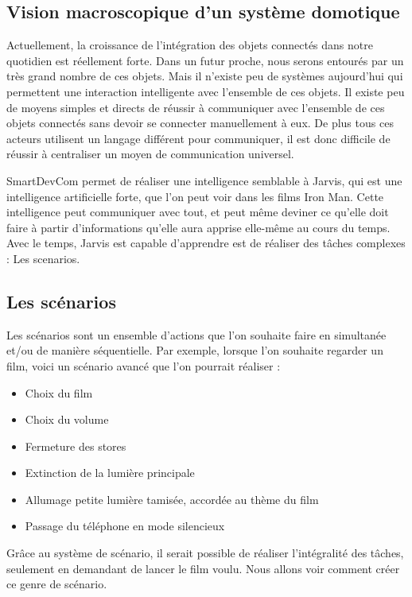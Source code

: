 	\subsection{Vision macroscopique d’un système domotique}
Actuellement, la croissance de l'intégration des objets connectés dans notre quotidien est réellement forte. 
Dans un futur proche, nous serons entourés par un très grand nombre de ces objets. Mais il n'existe peu de systèmes aujourd'hui qui permettent une interaction intelligente avec l'ensemble de ces objets. Il existe peu de moyens simples et directs de réussir à communiquer avec l'ensemble de ces objets connectés sans devoir se connecter manuellement à eux. De plus tous ces acteurs utilisent un langage différent pour communiquer, il est donc difficile de réussir à centraliser un moyen de communication universel.

SmartDevCom permet de réaliser une intelligence semblable à Jarvis, qui est une intelligence artificielle forte, que l'on peut voir dans les films Iron Man. Cette intelligence peut communiquer avec tout, et peut même deviner ce qu'elle doit faire à partir d'informations qu'elle aura apprise elle-même au cours du temps. Avec le temps, Jarvis est capable d'apprendre est de réaliser des tâches complexes : Les scenarios.
	\subsection{Les scénarios}
Les scénarios sont un ensemble d'actions que l'on souhaite faire en simultanée et/ou de manière séquentielle. 
Par exemple, lorsque l'on souhaite regarder un film, voici un scénario avancé que l'on pourrait réaliser :
\begin{itemize}
 \item Choix du film
 \item Choix du volume
 \item Fermeture des stores
 \item Extinction de la lumière principale
 \item Allumage petite lumière tamisée, accordée au thème du film
 \item Passage du téléphone en mode silencieux 
\end{itemize}

Grâce au système de scénario, il serait possible de réaliser l'intégralité des tâches, seulement en demandant de lancer le film voulu. Nous allons voir comment créer ce genre de scénario.
